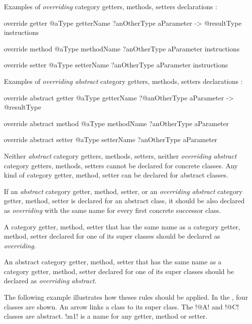 Examples of \emph{overriding} category getters, methods, setters declarations :
\begin{galgas3}
override getter @aType getterName
  ?anOtherType aParameter
  -> @resultType
{
  instructions
}

override method @aType methodName
  ?anOtherType aParameter
{
  instructions
}

override setter @aType setterName
  ?anOtherType aParameter
{
  instructions
}
\end{galgas3}


Examples of \emph{overriding abstract} category getters, methods, setters declarations :
\begin{galgas3}
override abstract getter @aType getterName
  ?@anOtherType aParameter
  -> @resultType

override abstract method @aType methodName
  ?anOtherType aParameter

override abstract setter @aType setterName
  ?anOtherType aParameter

\end{galgas3}



Neither \emph{abstract} category getters, methods, setters, neither \emph{overriding abstract} category getters, methods, setters cannot be declared for concrete classes. Any kind of category getter, method, setter can be declared for abstract classes.

If an \emph{abstract} category getter, method, setter, or an \emph{overriding abstract} category getter, method, setter is declared for an abstract class, it should be also declared as \emph{overriding} with the same name for every first concrete successor class.

A category getter, method, setter that has the same name as a category getter, method, setter declared for one of its super classes should be declared as \emph{overriding}.

An abstract category getter, method, setter that has the same name as a category getter, method, setter declared for one of its super classes should be declared as \emph{overriding abstract}.

The following example illustrates how theses rules should be applied. In the , four classes are shown. An arrow links a class to its super class. The \ggst!@A! and \ggst!@C! classes are abstract. \ggst!m1! is a name for any getter, method or setter.

